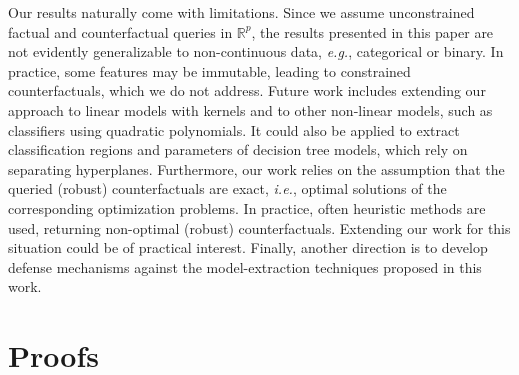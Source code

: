 \documentclass{article}
\begin{document}
{Our results naturally come with limitations. Since we assume unconstrained factual and counterfactual queries in $\mathbb{R}^p$, the results presented in this paper are not evidently generalizable to non-continuous data, \textit{e.g.}, categorical or binary. In practice, some features may be immutable, leading to constrained counterfactuals, which we do not address. Future work includes extending our approach to linear models with kernels and to other non-linear models, such as classifiers using quadratic polynomials.
It could also be applied to extract classification regions and parameters of decision tree models, which rely on separating hyperplanes. Furthermore, our work relies on the assumption that the queried (robust) counterfactuals are exact, \textit{i.e.}, optimal solutions of the corresponding optimization problems. In practice, often heuristic methods are used, returning non-optimal (robust) counterfactuals. Extending our work for this situation could be of practical interest.  Finally, another direction is to develop defense mechanisms against the model-extraction techniques proposed in this work.







\newpage

\appendix

\section{Proofs}\label{app:proofs}
}
\end{document}
